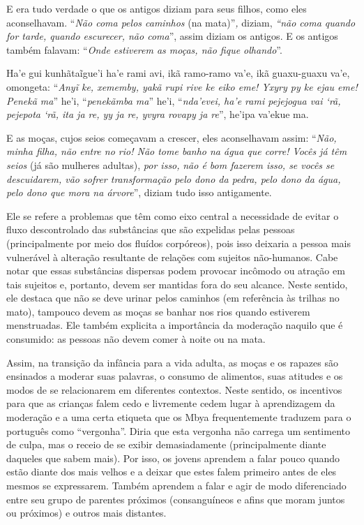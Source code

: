 \begin{paracol}{2}
\bigskip

\switchcolumn
\noindent
E era tudo verdade o que os antigos diziam para seus filhos, como eles
aconselhavam. ``\emph{Não coma pelos caminhos} (na mata)''\emph{,}
diziam, \emph{``não coma quando for tarde, quando escurecer, não
coma}'', assim diziam os antigos. E os antigos também falavam:
``\emph{Onde estiverem as moças, não fique olhando}''.

\smallskip

\switchcolumn
\noindent
Ha'e gui kunhãtaĩgue'i ha'e rami avi, ikã ramo-ramo va'e, ikã
guaxu-guaxu va'e, omongeta: ``\emph{Anyĩ ke, xememby, yakã rupi rive ke
eiko eme! Yxyry py ke ejau eme! Penekã ma}'' he'i, ``\emph{penekãmba
ma}'' he'i, ``\emph{nda'evei, ha'e rami pejejogua vai `rã, pejepota `rã,
ita ja re, yy ja re, yvyra rovapy ja re}'', he'ipa va'ekue ma.

\bigskip

\switchcolumn
\noindent
E as moças, cujos seios começavam a crescer, eles aconselhavam assim:
``\emph{Não, minha filha, não entre no rio! Não tome banho na água que
corre! Vocês já têm seios} (já são mulheres adultas), \emph{por isso,}
\emph{não é bom fazerem isso, se vocês se descuidarem, vão sofrer
transformação pelo dono da pedra, pelo dono da água, pelo dono que mora
na árvore}'', diziam tudo isso antigamente.\\
\end{paracol}

\bigskip

Ele se refere a problemas que têm como eixo central a necessidade de
evitar o fluxo descontrolado das substâncias que são expelidas pelas
pessoas (principalmente por meio dos fluídos corpóreos), pois isso
deixaria a pessoa mais vulnerável à alteração resultante de relações
com sujeitos não-humanos. Cabe notar que essas substâncias dispersas
podem provocar incômodo ou atração em tais sujeitos e, portanto, devem
ser mantidas fora do seu alcance. Neste sentido, ele destaca que não se
deve urinar pelos caminhos (em referência às trilhas no mato), tampouco
devem as moças se banhar nos rios quando estiverem menstruadas. Ele
também explicita a importância da moderação naquilo que é consumido: as
pessoas não devem comer à noite ou na mata. 

Assim, na transição da infância para a vida adulta, as moças e os
rapazes são ensinados a moderar suas palavras, o consumo de alimentos,
suas atitudes e os modos de se relacionarem em diferentes contextos.
Neste sentido, os incentivos para que as crianças falem cedo e
livremente cedem lugar à aprendizagem da moderação e a uma certa
etiqueta que os Mbya frequentemente traduzem para o português como
``vergonha''. Diria que esta vergonha não carrega um sentimento de culpa,
mas o receio de se exibir demasiadamente (principalmente diante
daqueles que sabem mais). Por isso, os jovens aprendem a falar pouco
quando estão diante dos mais velhos e a deixar que estes falem primeiro
antes de eles mesmos se expressarem. Também aprendem a falar e agir de
modo diferenciado entre seu grupo de parentes próximos (consanguíneos e
afins que moram juntos ou próximos) e outros mais distantes. 

